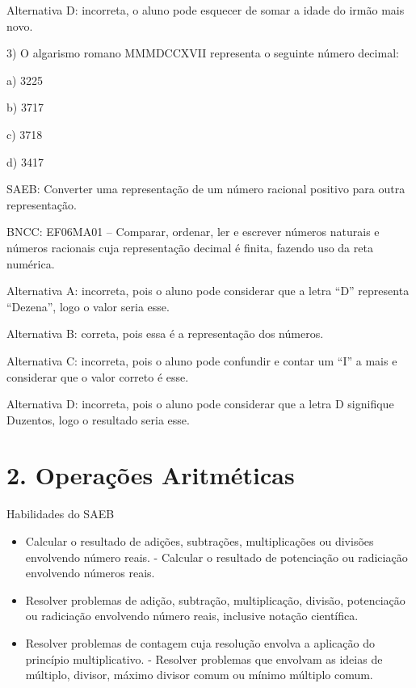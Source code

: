 Alternativa D: incorreta, o aluno pode esquecer de somar a idade do
irmão mais novo.

3) O algarismo romano MMMDCCXVII representa o seguinte número decimal:

a) 3225

b) 3717

c) 3718

d) 3417

SAEB: Converter uma representação de um número racional positivo para
outra representação.

BNCC: EF06MA01 -- Comparar, ordenar, ler e escrever números naturais e
números racionais cuja representação decimal é finita, fazendo uso da
reta numérica.

Alternativa A: incorreta, pois o aluno pode considerar que a letra ``D''
representa ``Dezena'', logo o valor seria esse.

Alternativa B: correta, pois essa é a representação dos números.

Alternativa C: incorreta, pois o aluno pode confundir e contar um ``I''
a mais e considerar que o valor correto é esse.

Alternativa D: incorreta, pois o aluno pode considerar que a letra D
signifique Duzentos, logo o resultado seria esse.

\chapter{2. Operações
Aritméticas}

Habilidades do SAEB 


\begin{itemize}
\item 
  Calcular o resultado de adições, subtrações,
multiplicações ou divisões envolvendo número reais. - Calcular o
resultado de potenciação ou radiciação envolvendo números reais.

\item
  Resolver problemas de adição, subtração, multiplicação, divisão,
  potenciação ou radiciação envolvendo número reais, inclusive notação
  científica.

\item
  Resolver problemas de contagem cuja resolução envolva a aplicação do
  princípio multiplicativo. - Resolver problemas que envolvam as ideias
  de múltiplo, divisor, máximo divisor comum ou mínimo múltiplo comum.
\end{itemize}


